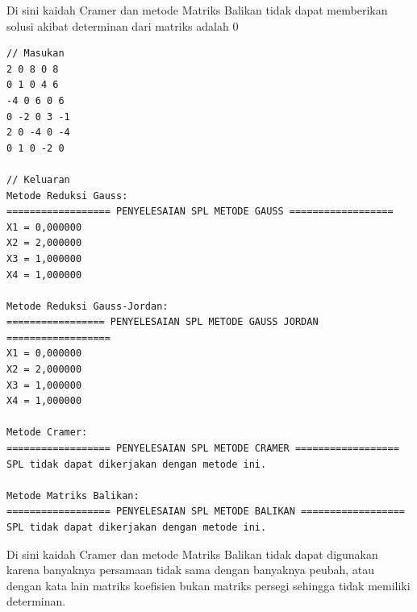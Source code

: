 Di sini kaidah Cramer dan metode Matriks Balikan tidak dapat memberikan solusi akibat determinan dari matriks adalah 0

\begin{lstlisting}[caption = spl-2b.txt]
// Masukan
2 0 8 0 8
0 1 0 4 6
-4 0 6 0 6
0 -2 0 3 -1
2 0 -4 0 -4
0 1 0 -2 0

// Keluaran
Metode Reduksi Gauss:
================== PENYELESAIAN SPL METODE GAUSS ==================
X1 = 0,000000
X2 = 2,000000
X3 = 1,000000
X4 = 1,000000

Metode Reduksi Gauss-Jordan:
================= PENYELESAIAN SPL METODE GAUSS JORDAN ==================
X1 = 0,000000
X2 = 2,000000
X3 = 1,000000
X4 = 1,000000

Metode Cramer:
================== PENYELESAIAN SPL METODE CRAMER ==================
SPL tidak dapat dikerjakan dengan metode ini.

Metode Matriks Balikan:
================== PENYELESAIAN SPL METODE BALIKAN ==================
SPL tidak dapat dikerjakan dengan metode ini.\end{lstlisting}

Di sini kaidah Cramer dan metode Matriks Balikan tidak dapat digunakan karena banyaknya persamaan tidak sama dengan banyaknya peubah, atau dengan kata lain matriks koefisien bukan matriks persegi sehingga tidak memiliki determinan.

\pagebreak
